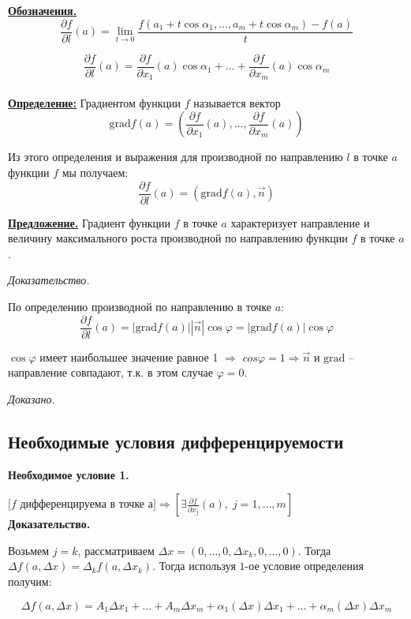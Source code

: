 \documentclass[a4paper,12pt]{article} %
\begin{document}
 \underline{\textbf{Обозначения.}}
 \[\frac{\partial f}{\partial l}(a) = \lim\limits_{t \to 0} \frac{f(a_1 + t\cos\alpha_1, \ldots, a_m + t\cos\alpha_m) - f(a)}{t}\]
 
 \[\frac{\partial f}{\partial l}(a) = \frac{\partial f}{\partial x_1}(a)\cos\alpha_1 + \ldots + \frac{\partial f}{\partial x_m}(a)\cos\alpha_m\]\\
 
 \underline{\textbf{Определение:}} Градиентом функции $f$ называется вектор \[\mathrm{grad}{f(a)} = (\frac{\partial f}{\partial x_1}(a), \ldots, \frac{\partial f}{\partial x_m}(a))\]
 
 Из этого определения и выражения для производной по направлению $l$ в точке $a$ функции $f$ мы получаем:
 \[\frac{\partial f}{\partial l}(a) = (\mathrm{grad}{f(a), \vec{n}})\]
 
\underline{\textbf{Предложение.}}
 Градиент функции $f$ в точке $a$ характеризует направление и величину максимального роста производной по направлению функции $f$ в точке $a$.
 
 \textit{Доказательство.}
 
 По определению производной по направлению в точке $a$:
 \[\frac{\partial f}{\partial l}(a) = |\mathrm{grad}{f(a)}| |\vec{n}|\cos\varphi = |\mathrm{grad}{f(a)}|\cos\varphi\]
 
 $\cos\varphi$ имеет наибольшее значение равное 1 $\Rightarrow$
 $cos\varphi = 1 \Rightarrow \vec{n}$ и $\mathrm{grad}$ -- направление совпадают, т.к. в этом случае $\varphi = 0$.
 
 \textit{Доказано.}
 \subsection{Необходимые условия дифференцируемости}
 
 \textbf{Необходимое условие 1.}
 
 $[f$ дифференцируема в точке а$] \Rightarrow [\exists \frac{\partial f}{\partial x_j}(a), \; j = 1, \ldots, m]$\\
 
 \textbf{Доказательство.}
 
 Возьмем $j = k$, рассматриваем $\Delta x = (0, \ldots, 0, \Delta x_k, 0, \ldots, 0)$. Тогда $\Delta f(a, \Delta x) = \Delta_k f(a, \Delta x_k)$. Тогда используя $1$-ое условие определения получим:
 
 \[\Delta f(a, \Delta x) = A_1 \Delta x_1 + \ldots + A_m \Delta x_m + \alpha_1(\Delta x) \Delta x_1 + \ldots + \alpha_m (\Delta x)\Delta x_m\] 
 
\end{document}
